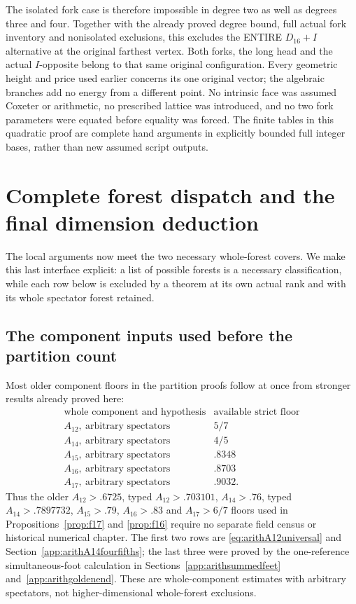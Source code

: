 The isolated fork case is therefore
impossible in degree two as well
as degrees three and four.
Together with the already proved
degree bound, full actual fork
inventory and nonisolated exclusions,
this excludes the ENTIRE
\(D_{16}+I\) alternative at the
original farthest vertex.
Both forks, the long head and
the actual \(I\)-opposite belong
to that same original configuration.
Every geometric height and price
used earlier concerns its one
original vector; the algebraic
branches add no energy from a
different point.
No intrinsic face was assumed
Coxeter or arithmetic, no prescribed
lattice was introduced, and no
two fork parameters were equated
before equality was forced.
The finite tables in this quadratic
proof are complete hand arguments
in explicitly bounded full integer
bases, rather than new assumed
script outputs.

\section{Complete forest dispatch and the final dimension deduction}
\label{app:arithcoverclosure}

The local arguments now meet the two
necessary whole-forest covers.
We make this last interface explicit:
a list of possible forests is a
necessary classification, while each
row below is excluded by a theorem
at its own actual rank and with its
whole spectator forest retained.

\subsection{The component inputs used before the partition count}
\label{app:arithcoverinputs}

Most older component floors in the
partition proofs follow at once
from stronger results already proved
here:
\[
\begin{array}{c|c}
 \text{whole component and hypothesis}&\text{available strict floor}\\ \hline
 A_{12},\ \text{arbitrary spectators}&5/7\\
 A_{14},\ \text{arbitrary spectators}&4/5\\
 A_{15},\ \text{arbitrary spectators}&.8348\\
 A_{16},\ \text{arbitrary spectators}&.8703\\
 A_{17},\ \text{arbitrary spectators}&.9032 .
\end{array}
\]
Thus the older \(A_{12}>.6725\),
typed \(A_{12}>.703101\), \(A_{14}>.76\),
typed \(A_{14}>.7897732\),
\(A_{15}>.79\), \(A_{16}>.83\) and
\(A_{17}>6/7\) floors used in
Propositions~\ref{prop:f17} and
\ref{prop:f16} require no separate
field census or historical numerical
chapter.
The first two rows are
\eqref{eq:arithA12universal} and
Section~\ref{app:arithA14fourfifths};
the last three were proved by the
one-reference simultaneous-foot
calculation in
Sections~\ref{app:arithsummedfeet}
and~\ref{app:arithgoldenend}.
These are whole-component estimates
with arbitrary spectators, not
higher-dimensional whole-forest
exclusions.

